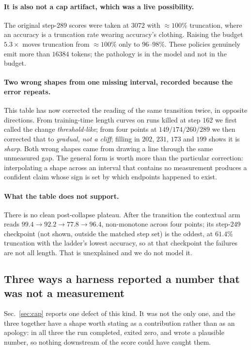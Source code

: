 \paragraph{It is also not a cap artifact, which was a live possibility.} The original
step-$289$ scores were taken at $3072$ with $\approx 100\%$ truncation, where an accuracy is a
truncation rate wearing accuracy's clothing. Raising the budget $5.3\times$ moves truncation
from $\approx 100\%$ only to $96$--$98\%$. These policies genuinely emit more than $16384$
tokens; the pathology is in the model and not in the budget.

\paragraph{Two wrong shapes from one missing interval, recorded because the error repeats.}
This table has now corrected the reading of the same transition twice, in opposite directions.
From training-time length curves on runs killed at step $162$ we first called the change
\emph{threshold-like}; from four points at $149/174/260/289$ we then corrected that to
\emph{gradual, not a cliff}; filling in $202$, $231$, $173$ and $199$ shows it is
\emph{sharp}. Both wrong shapes came from drawing a line through the same unmeasured gap.
The general form is worth more than the particular correction: interpolating a shape across an
interval that contains no measurement produces a confident claim whose sign is set by which
endpoints happened to exist.

\paragraph{What the table does not support.} There is no clean post-collapse plateau. After
the transition the contextual arm reads $99.4 \to 92.2 \to 77.8 \to 96.4$, non-monotone across
four points; its step-$249$ checkpoint (not shown, outside the matched step set) is the oddest,
at $61.4\%$ truncation with the ladder's lowest accuracy, so at that checkpoint the failures
are not all length. That is unexplained and we do not model it.

\subsection{Three ways a harness reported a number that was not a measurement}
\label{sec:harness}

Sec.~\ref{sec:cap} reports one defect of this kind. It was not the only one, and the three
together have a shape worth stating as a contribution rather than as an apology: in all three
the run completed, exited zero, and wrote a plausible number, so nothing downstream of the
score could have caught them.

